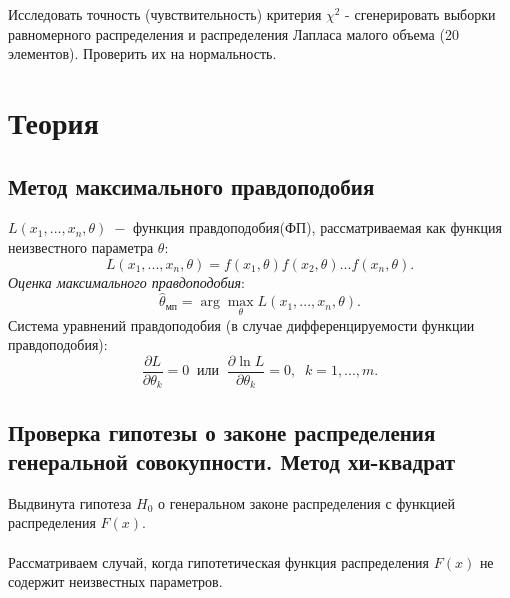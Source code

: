 \documentclass[a4paper,12pt]{article} %
\begin{document}
Исследовать точность (чувствительность) критерия $\chi^2$ - сгенерировать выборки равномерного распределения и распределения Лапласа малого объема (20 элементов). Проверить их на нормальность.
\section{Теория}
\subsection{Метод максимального правдоподобия}
$L(x_1,...,x_n,\theta)\;-$ функция правдоподобия(ФП), рассматриваемая как функция неизвестного параметра $\theta$:
\begin{equation}
    L(x_1,...,x_n,\theta)=f(x_1,\theta)f(x_2,\theta)...f(x_n,\theta).
\end{equation}
\textit{Оценка максимального правдоподобия}:
\begin{equation}
    \widehat{\theta}_{\text{мп}}=\arg{\max_\theta{L(x_1,...,x_n,\theta)}}.
\end{equation}
Система уравнений правдоподобия (в случае дифференцируемости функции правдоподобия):
\begin{equation}
    \frac{\partial L}{\partial\theta_k}=0\;\;\text{или}\;\;\frac{\partial\ln{L}}{\partial\theta_k}=0,\;\;k=1,...,m.
\end{equation}
\subsection{Проверка гипотезы о законе распределения генеральной совокупности. Метод хи-квадрат}
Выдвинута гипотеза $H_0$ о генеральном законе распределения с функцией
распределения $F(x)$.\\\\
Рассматриваем случай, когда гипотетическая функция распределения $F(x)$ не содержит неизвестных параметров.
\end{document}
